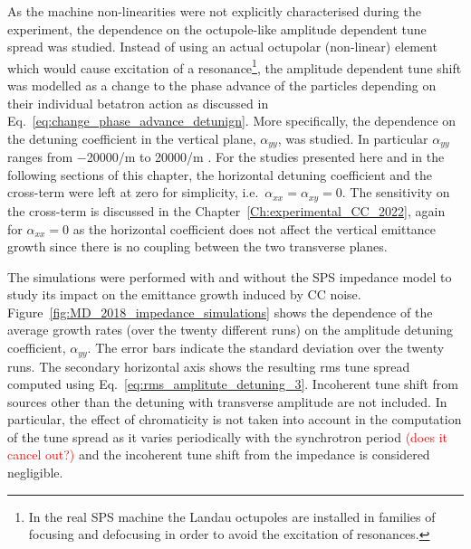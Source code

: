 As the machine non-linearities were not explicitly characterised during the experiment, the dependence on the octupole-like amplitude dependent tune spread was studied. Instead of using an actual octupolar (non-linear) element which would cause excitation of a resonance\footnote{In the real SPS machine the Landau octupoles are installed in families of focusing and defocusing in order to avoid the excitation of resonances.}, the amplitude dependent tune shift was modelled as a change to the phase advance of the particles depending on their individual betatron action as discussed in Eq.~\eqref{eq:change_phase_advance_detunign}. More specifically, the dependence on the detuning coefficient in the vertical plane, $\alpha_{yy}$, was studied. In particular $\alpha_{yy}$ ranges from $-$20000/m to 20000/m . For the studies presented here and in the following sections of this chapter, the horizontal detuning coefficient and the cross-term were left at zero for simplicity, i.e.~$\alpha_{xx} = \alpha_{xy} = 0$. %
The sensitivity on the cross-term is discussed in the Chapter~\ref{Ch:experimental_CC_2022}, again for $\alpha_{xx} = 0$ as the horizontal coefficient does not affect the vertical emittance growth since there is no coupling between the two transverse planes.

The simulations were performed with and without the SPS impedance model to study its impact on the emittance growth induced by CC noise. Figure~\ref{fig:MD_2018_impedance_simulations} shows the dependence of the average growth rates (over the twenty different runs) on the amplitude detuning coefficient, $\alpha_{yy}$. The error bars indicate the standard deviation over the twenty runs. The secondary horizontal axis shows the resulting rms tune spread computed using Eq.~\eqref{eq:rms_amplitute_detuning_3}. Incoherent tune shift from sources other than the detuning with transverse amplitude are not included. In particular, the effect of chromaticity is not taken into account in the computation of the tune spread as it varies periodically with the synchrotron period \textcolor{red}{(does it cancel out?)} and the incoherent tune shift from the impedance is considered negligible. 

